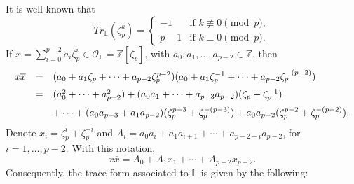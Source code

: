 \documentclass{amsart}
\begin{document}
It is well-known that $$Tr_{\mathbb{L}}(\zeta_p^k)=\begin{cases} -1 & \textrm{if } k\not\equiv 0 \pmod p,\\ p-1 & \textrm{if } k\equiv 0\pmod p. \end{cases}$$ If $x=\displaystyle \sum_{i=0}^{p-2}a_i\zeta_p^i\in\mathcal{O}_\mathbb{L}=\mathbb{Z}[\zeta_p]$, with $a_0,a_1,\ldots,a_{p-2}\in\mathbb{Z}$, then
\[  \begin{array}{lll} x\overline{x} &=& (a_0+a_1\zeta_p+\cdots+a_{p-2}\zeta_p^{p-2})(a_0+a_1\zeta_p^{-1}+\cdots+a_{p-2}\zeta_p^{-(p-2)})\vspace{.2cm} \\ &=&(a_0^2+\cdots +a_{p-2}^2)+(a_0a_1+\cdots +a_{p-3}a_{p-2})(\zeta_p+\zeta_p^{-1})\vspace{.2cm}\\ && \displaystyle +\cdots + (a_0a_{p-3}+a_1a_{p-2})(\zeta_p^{p-3}+\zeta_p^{-(p-3)})+a_0a_{p-2}(\zeta_p^{p-2}+\zeta_p^{-(p-2)}).\end{array} \]
Denote $x_i=\zeta_p^{i}+\zeta_p^{-i}$ and $A_i=a_0a_i+a_1a_{i+1}+\cdots +a_{p-2-i}a_{p-2}$, for $i=1,\ldots,p-2$. With this notation, \begin{equation} \label{expxxbarra} x\overline{x}=A_0+A_1x_1+\cdots +A_{p-2}x_{p-2}. \end{equation}
Consequently, the trace form associated to $\mathbb{L}$ is given by the following:
\end{document}
